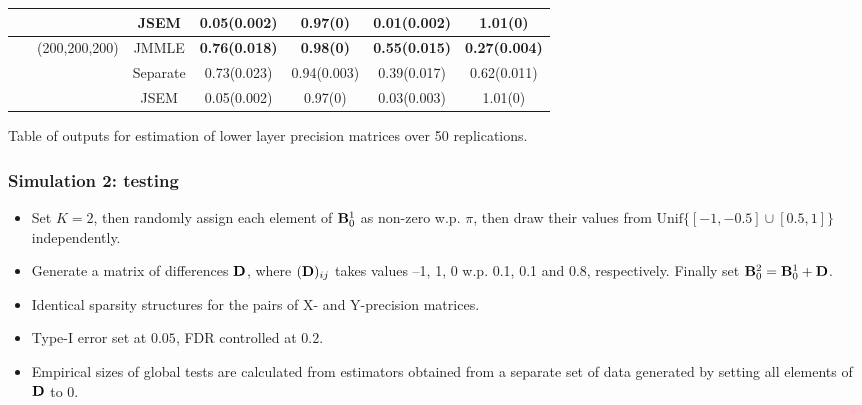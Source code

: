 \documentclass[10pt]{beamer}
\theoremstyle{definition}
\begin{document}
\begin{frame}
\begin{scriptsize}
\begin{tabular}{ccccccc}
    ~              & ~             & JSEM     & 0.05(0.002) & 0.97(0)      & 0.01(0.002)  & 1.01(0)     \\\hline
    ~              & (200,200,200) & JMMLE    & \textbf{0.76(0.018)}  & \textbf{0.98(0)}     & \textbf{0.55(0.015)}  & \textbf{0.27(0.004)} \\
    ~              & ~             & Separate & 0.73(0.023) & 0.94(0.003)  & 0.39(0.017)  & 0.62(0.011)\\
    ~              & ~             & JSEM     & 0.05(0.002) & 0.97(0)      & 0.03(0.003)  & 1.01(0)     \\\hline
\end{tabular}
    
\begin{center}
Table of outputs for estimation of lower layer precision matrices over 50 replications.
\end{center}
\end{scriptsize}

\end{frame}

\begin{frame}
\frametitle{Simulation 2: testing}

\begin{itemize}
\item Set $K=2$, then randomly assign each element of ${\mathbf{B}}_0^1$ as non-zero w.p. $\pi$, then draw their values from $\text{Unif}\{ [ -1, -0.5] \cup [0.5,1]\}$ independently.

\item Generate a matrix of differences ${\mathbf{D}}$, where $({\mathbf{D}})_{ij}$ takes values --1, 1, 0 w.p. 0.1, 0.1 and 0.8, respectively. Finally set ${\mathbf{B}}_0^2 = {\mathbf{B}}_0^1 + {\mathbf{D}}$.

\item Identical sparsity structures for the pairs of X- and Y-precision matrices.

\item Type-I error set at $0.05$, FDR controlled at $0.2$.

\item Empirical sizes of global tests are calculated from estimators obtained from a separate set of data generated by setting all elements of ${\mathbf{D}}$ to 0.
\end{itemize}
\end{frame}
\end{document}
